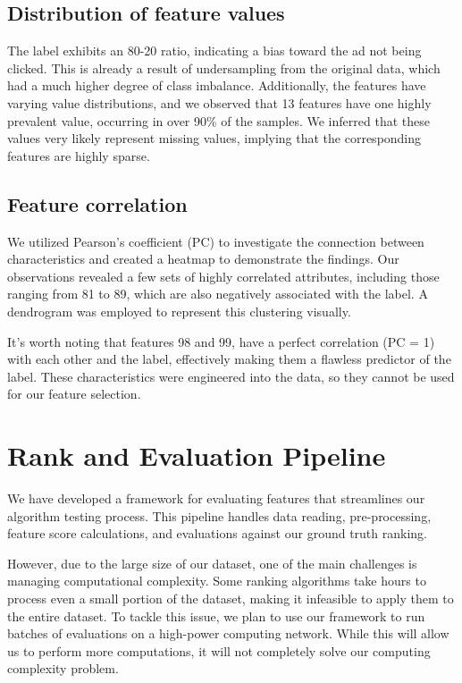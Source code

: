 \documentclass[fleqn,moreauthors,10pt]{ds_report}
\begin{document}
\subsection*{Distribution of feature values}
The label exhibits an 80-20 ratio, indicating a bias toward the ad not being clicked. This is already a result of undersampling from the original data, which had a much higher degree of class imbalance. Additionally, the features have varying value distributions, and we observed that 13 features have one highly prevalent value, occurring in over 90\% of the samples. We inferred that these values very likely represent missing values, implying that the corresponding features are highly sparse. 

\subsection*{Feature correlation}
We utilized Pearson's coefficient (PC) to investigate the connection between characteristics and created a heatmap to demonstrate the findings. Our observations revealed a few sets of highly correlated attributes, including those ranging from 81 to 89, which are also negatively associated with the label. A dendrogram was employed to represent this clustering visually.

It's worth noting that features 98 and 99, have a perfect correlation (PC = 1) with each other and the label, effectively making them a flawless predictor of the label. These characteristics were engineered into the data, so they cannot be used for our feature selection.

\section*{Rank and Evaluation Pipeline}

We have developed a framework for evaluating features that streamlines our algorithm testing process. This pipeline handles data reading, pre-processing, feature score calculations, and evaluations against our ground truth ranking.

However, due to the large size of our dataset, one of the main challenges is managing computational complexity. Some ranking algorithms take hours to process even a small portion of the dataset, making it infeasible to apply them to the entire dataset. To tackle this issue, we plan to use our framework to run batches of evaluations on a high-power computing network. While this will allow us to perform more computations, it will not completely solve our computing complexity problem.
\end{document}
